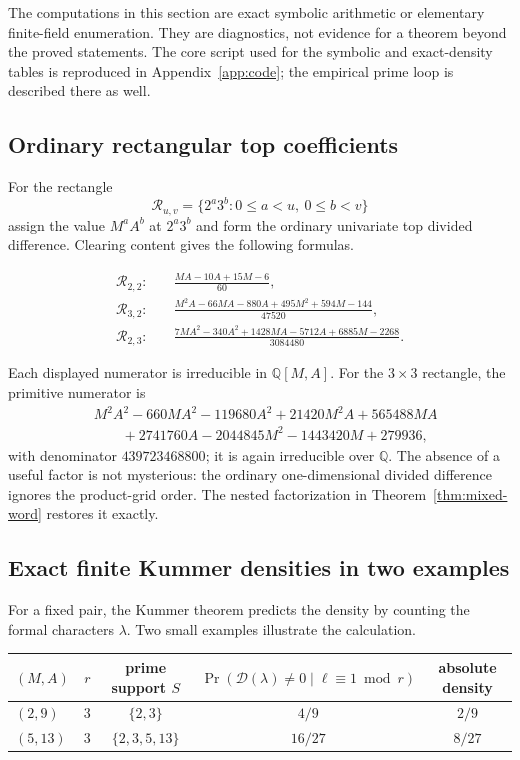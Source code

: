 \documentclass[11pt,oneside]{article}
\theoremstyle{definition}
\theoremstyle{remark}
\newcommand{\Q}{\mathbb Q}
\begin{document}
The computations in this section are exact symbolic arithmetic or elementary finite-field
enumeration.  They are diagnostics, not evidence for a theorem beyond the proved statements.
The core script used for the symbolic and exact-density tables is reproduced in Appendix~\ref{app:code}; the empirical prime loop is described there as well.

\subsection{Ordinary rectangular top coefficients}

For the rectangle
\[
 \mathcal R_{u,v}=\{2^a3^b:0\le a<u,\ 0\le b<v\}
\]
assign the value $M^aA^b$ at $2^a3^b$ and form the ordinary univariate top divided
difference.  Clearing content gives the following formulas.

\begin{align}
 \mathcal R_{2,2}:\quad
 &\frac{MA-10A+15M-6}{60},
 \label{eq:comp-22}\\[0.4em]
 \mathcal R_{3,2}:\quad
 &\frac{M^2A-66MA-880A+495M^2+594M-144}{47520},
 \label{eq:comp-32}\\[0.4em]
 \mathcal R_{2,3}:\quad
 &\frac{7MA^2-340A^2+1428MA-5712A+6885M-2268}{3084480}.
 \label{eq:comp-23}
\end{align}

Each displayed numerator is irreducible in $\Q[M,A]$.  For the $3\times3$ rectangle, the
primitive numerator is
\begin{align*}
 &M^2A^2-660MA^2-119680A^2+21420M^2A+565488MA\\
 &\qquad{}+2741760A-2044845M^2-1443420M+279936,
\end{align*}
with denominator $439723468800$; it is again irreducible over $\Q$.  The absence of a useful
factor is not mysterious: the ordinary
one-dimensional divided difference ignores the product-grid order.  The nested factorization
in Theorem~\ref{thm:mixed-word} restores it exactly.

\subsection{Exact finite Kummer densities in two examples}

For a fixed pair, the Kummer theorem predicts the density by counting the formal characters
$\lambda$.  Two small examples illustrate the calculation.

\begin{center}
\small
\begin{tabular}{@{}lcccc@{}}
\toprule
$(M,A)$ & $r$ & prime support $S$ &
$\Pr(\mathscr D(\lambda)\ne0\mid\ell\equiv1\bmod r)$ &
absolute density \\
\midrule
$(2,9)$ & $3$ & $\{2,3\}$ & $4/9$ & $2/9$ \\
$(5,13)$ & $3$ & $\{2,3,5,13\}$ & $16/27$ & $8/27$ \\
\bottomrule
\end{tabular}
\end{center}
\end{document}
